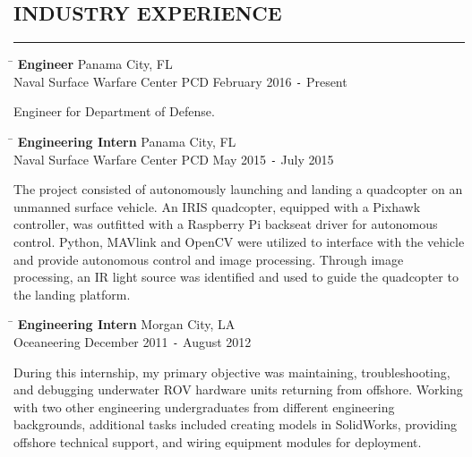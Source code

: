 \documentclass{res}
\begin{document}
\begin{resume}
\section{INDUSTRY EXPERIENCE}
	\vspace{0.005in}	
	\rule{\textwidth}{0.5pt}
	\vspace{-0.4in}
	\begin{tabbing}
		\hspace{4.652in}\= \kill %
		{\bf Engineer} \> \hspace{0.3in}Panama City, FL  \\  
		Naval Surface Warfare Center PCD \> February 2016 \texttt{-} Present	
	\end{tabbing}\vspace{-20pt}      %
	\vspace{8pt} Engineer for Department of Defense.
	\vspace{-0.2in}\begin{tabbing}
		\hspace{4.652in}\= \kill %
		{\bf Engineering Intern} \> \hspace{0.3in}Panama City, FL  \\  
		 Naval Surface Warfare Center PCD \> May 2015 \texttt{-} July 2015	
	\end{tabbing}\vspace{-20pt}      %
	\vspace{8pt}The project consisted of autonomously launching and landing a quadcopter on an unmanned surface vehicle. An IRIS quadcopter, equipped with a Pixhawk controller, was outfitted with a Raspberry Pi backseat driver for autonomous control. Python, MAVlink and OpenCV were utilized to interface with the vehicle and provide autonomous control and image processing. Through image processing, an IR light source was identified and used to guide the quadcopter to the landing platform.
	\vspace{-0.2in}
	\begin{tabbing}
		\hspace{4.155in}\=  \kill %
		{\bf Engineering Intern} \> \hspace{0.815in}Morgan City, LA \\
		Oceaneering \>December 2011 \texttt{-} August 2012
	\end{tabbing}\vspace{-20pt}
	\vspace{8pt}During this internship, my primary objective was maintaining, troubleshooting, and debugging underwater ROV hardware units returning from offshore. Working with two other engineering undergraduates from different engineering backgrounds, additional tasks included creating models in SolidWorks, providing offshore technical support, and wiring equipment modules for deployment.


\end{resume}
\end{document}
